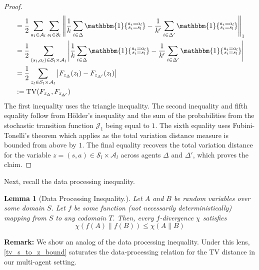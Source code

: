 \documentclass{article}
\theoremstyle{plain}
\newtheorem{lemma}[theorem]{Lemma}
\theoremstyle{definition}
\begin{document}
\begin{proof}
\begin{align*}
&= \frac{1}{2}\sum_{a_l\in\mathcal{A}_l}\sum_{s_l\in\mathcal{S}_l}\left\|\frac{1}{k}\sum_{i\in\Delta}\mathbbm{1}\{\substack{a_i=a_l\\ s_i=s_l}\} - \frac{1}{k'}\sum_{i\in\Delta'}\mathbbm{1}\{\substack{a_i = a_l\\ s_i = s_l}\}\right\|_1 \\
& = \frac{1}{2}\sum_{(s_l,a_l)\in\mathcal{S}_l\times\mathcal{A}_l}\left|\frac{1}{k}\sum_{i\in\Delta}\mathbbm{1}\{\substack{a_i=a_l\\ s_i=s_l}\} - \frac{1}{k'}\sum_{i\in\Delta'}\mathbbm{1}\{\substack{a_i = a_l\\ s_i = s_l}\}\right| \\
& = \frac{1}{2}\sum_{z_l\in\mathcal{S}_l\times\mathcal{A}_l}\left|F_{z_\Delta}(z_l) - F_{z_{\Delta'}}(z_l)\right| \\
&:= \mathrm{TV}(F_{z_\Delta}, F_{z_{\Delta'}})
\end{align*}
The first inequality uses the triangle inequality. The second inequality and fifth equality follow from Hölder's inequality and the sum of the probabilities from the stochastic transition function $\mathcal{J}_1$ being equal to $1$. The sixth equality uses Fubini-Tonelli's theorem which applies as the total variation distance measure is bounded from above by $1$. The final equality recovers the total variation distance for the variable $z=(s,a)\in \mathcal{S}_l\times\mathcal{A}_l$ across agents $\Delta$ and $\Delta'$, which proves the claim.\qedhere \end{proof}

Next, recall the data processing inequality.
\begin{lemma}[Data Processing Inequality.] Let $A$ and $B$ be random variables over some domain $S$. Let $f$ be some function (not necessarily deterministically) mapping from $S$ to any codomain $T$. Then, every $f$-divergence $\chi$ satisfies
\[\chi(f(A)\|f(B))\leq \chi(A\|B)\]
\end{lemma}
\textbf{Remark:} We show an analog of the data processing inequality. Under this lens, \cref{tv_s_to_z_bound} saturates the data-processing relation for the TV distance in our multi-agent setting.
\end{document}
